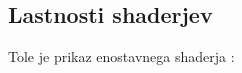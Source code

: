 {\color{indiagreen}\subsection{Lastnosti shaderjev}}
Tole je prikaz enostavnega shaderja \cite{shaders}:

